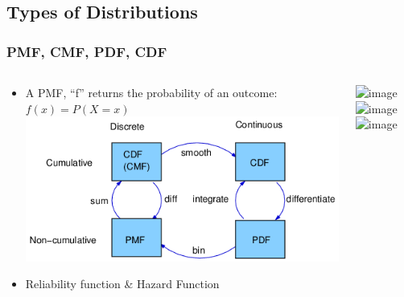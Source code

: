 \documentclass{beamer}
\begin{document}
\subsection{Types of Distributions} 

\begin{frame}\frametitle{PMF, CMF, PDF, CDF}
\begin{columns}
	\begin{column}{5cm}
		\begin{itemize}
			\item<1> A PMF, “f” returns the probability of an outcome: $f(x)=P(X=x)$ 
			 \includegraphics[scale=0.35]{CdfPdfPmf} 
			 \newline
			\item<2> Reliability function \& Hazard Function
		\end{itemize}
		\vspace{3cm} 
	\end{column}
	\begin{column}{5cm}
		\begin{overprint}		
			\includegraphics<1>[scale=0.3]{PmfCdfContinuous}
			\includegraphics<1>[scale=0.25]{pdfcdfDiscrete}
			\includegraphics<2>[scale=0.32]{cdfpdfrfhf}
		\end{overprint}
	\end{column}
\end{columns}
\end{frame}
\end{document}
